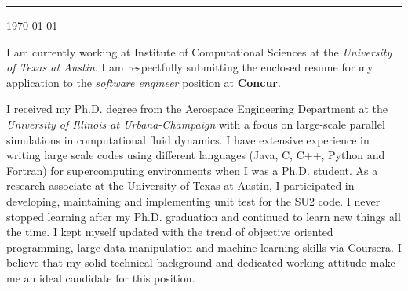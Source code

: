 \documentclass[11pt]{article}
\newcommand{\company}{\textbf{Concur}}
\newcommand{\position}{\textit{software engineer }}
\begin{document}
\thispagestyle{empty}
%
%
\begin{minipage}[t]{0.45\textwidth}
\vspace{-0.5truein}
\end{minipage} 



%
%
\vspace{0.2truein}
\rule[0.8em]{\textwidth}{1.0pt} 

\noindent
\begin{minipage}[b]{0.7\textwidth}
\vspace{-0.35truein}
\noindent
\small
\begin{tabbing}
\end{tabbing}
\vspace{0pt}
\end{minipage} \hfill
\begin{minipage}[b]{0.7\textwidth}
\vspace{0pt}
\noindent
\begin{tabbing}
\today 
\end{tabbing}
\vspace{0pt}
\end{minipage} 
%
%




I am currently working at Institute of Computational Sciences at the \emph{University of Texas at Austin}.   I am respectfully submitting the enclosed resume for my application to the \position position at \company.  

I received my Ph.D. degree from the Aerospace Engineering Department at the \emph{University of Illinois at Urbana-Champaign} with a focus on large-scale parallel simulations in computational fluid dynamics.   I have extensive experience in writing large scale codes using different languages (Java, C, C++, Python and Fortran) for supercomputing environments when I was a Ph.D. student.  As a research associate at the University of Texas at Austin, I participated in developing, maintaining and implementing unit test for the SU2 code.   I never stopped learning after my Ph.D. graduation and continued to learn new things all the time.  I kept myself updated with the trend of objective oriented programming, large data manipulation and machine learning skills via Coursera.    I believe that my solid technical background and dedicated working attitude make me an ideal candidate for this position. 
\end{document}
